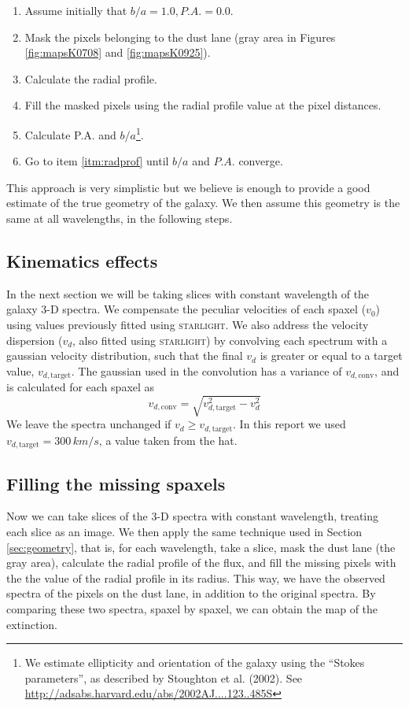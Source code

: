\documentclass[a4paper]{article}
\def\starlight{\textsc{starlight}\xspace}
\begin{document}
\begin{enumerate}
  \item Assume initially that $b/a = 1.0, P.A. = 0.0$.
  \item Mask the pixels belonging to the dust lane (gray area in Figures
  \ref{fig:mapsK0708} and \ref{fig:mapsK0925}).
  \item \label{itm:radprof} Calculate the radial profile.
  \item Fill the masked pixels using the radial profile value at the pixel distances.
  \item Calculate P.A. and $b/a$\footnote{We estimate ellipticity and
  orientation of the galaxy using the ``Stokes parameters'', as described by
  Stoughton et al. (2002). See \url{http://adsabs.harvard.edu/abs/2002AJ....123..485S}}.
  \item Go to item \ref{itm:radprof} until $b/a$ and $P.A.$ converge.
\end{enumerate}

This approach is very simplistic but we believe is enough to provide a good
estimate of the true geometry of the galaxy. We then assume this geometry is the
same at all wavelengths, in the following steps.

\subsection{Kinematics effects}

In the next section we will be taking slices with constant wavelength of the
galaxy 3-D spectra. We compensate the peculiar velocities of each spaxel ($v_0$)
using values previously fitted using \starlight. We also address the velocity
dispersion ($v_d$, also fitted using \starlight) by convolving each spectrum
with a gaussian velocity distribution, such that the final $v_d$ is greater or
equal to a target value, $v_{d,\text{target}}$. The gaussian used in the
convolution has a variance of $v_{d,\text{conv}}$, and is calculated for each
spaxel as \[ v_{d,\text{conv}} = \sqrt{v^2_{d,\text{target}} - v^2_d} \] We
leave the spectra unchanged if $v_d \geq v_{d,\text{target}}$. In this report we
used $v_{d,\text{target}} = 300\,km/s$, a value taken from the hat.

\subsection{Filling the missing spaxels}
\label{sec:filling}

Now we can take slices of the 3-D spectra with constant wavelength, treating
each slice as an image. We then apply the same technique used in Section
\ref{sec:geometry}, that is, for each wavelength, take a slice, mask the dust
lane (the gray area), calculate the radial profile of the flux, and fill the
missing pixels with the the value of the radial profile in its radius. This way,
we have the observed spectra of the pixels on the dust lane, in addition to the
original spectra. By comparing these two spectra, spaxel by spaxel, we can
obtain the map of the extinction.
\end{document}
